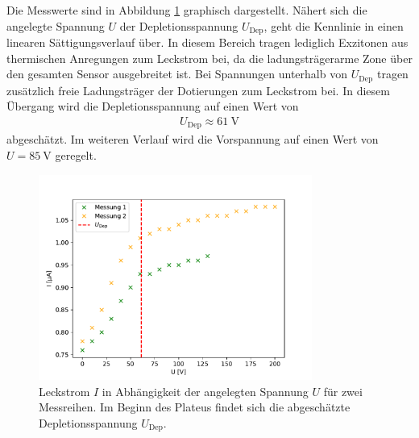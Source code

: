   Die Messwerte sind in Abbildung \ref{fig:UI-Kennlinie} graphisch dargestellt.
  Nähert sich die angelegte Spannung $U$ der Depletionsspannung $U_\mathrm{Dep}$, geht die Kennlinie in einen linearen Sättigungsverlauf über. In diesem Bereich tragen lediglich Exzitonen aus thermischen Anregungen zum Leckstrom bei, da die ladungsträgerarme Zone über den gesamten Sensor ausgebreitet ist. Bei Spannungen unterhalb von $U_\mathrm{Dep}$ tragen zusätzlich freie Ladungsträger der Dotierungen zum Leckstrom bei. In diesem Übergang wird die Depletionsspannung auf einen Wert von
  \begin{align*}
    U_\mathrm{Dep} \approx \SI{61}{\volt}
  \end{align*}
  abgeschätzt. Im weiteren Verlauf wird die Vorspannung auf einen Wert von $U=\SI{85}{\volt}$ geregelt.

\begin{figure}
  \centering
  \includegraphics[width=0.8\textwidth]{plots/Kennlinie.pdf}
  \caption{Leckstrom $I$ in Abhängigkeit der angelegten Spannung $U$ für zwei Messreihen. Im Beginn des Plateus findet sich die abgeschätzte Depletionsspannung $U_\mathrm{Dep}$.}
  \label{fig:UI-Kennlinie}
\end{figure}
\FloatBarrier


